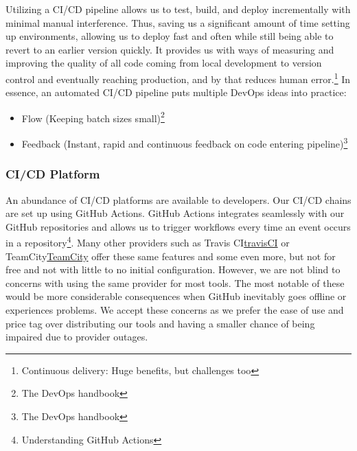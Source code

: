 Utilizing a CI/CD pipeline allows us to test, build, and deploy \mini incrementally with minimal manual interference. Thus, saving us a significant amount of time setting up environments, allowing us to deploy fast and often while still being able to revert to an earlier version quickly.
It provides us with ways of measuring and improving the quality of all code coming from local development to version control and eventually reaching production, and by that reduces human error.\footnote{Continuous delivery: Huge benefits, but challenges too\cite{Chen2015}}
In essence, an automated CI/CD pipeline puts multiple DevOps ideas into practice: 
\begin{itemize}
    \item Flow (Keeping batch sizes small)\footnote{\label{handbook}The DevOps handbook\cite{Kim2016}} 
    \item Feedback (Instant, rapid and continuous feedback on code entering pipeline)\footnote{The DevOps handbook\cite{Kim2016}}
\end{itemize}


\subsubsection{CI/CD Platform}
\label{subsubsec:cicdPlatform}
An abundance of CI/CD platforms are available to developers. Our CI/CD chains are set up using GitHub Actions. GitHub Actions integrates seamlessly with our GitHub repositories and allows us to trigger workflows every time an event occurs in a repository\footnote{Understanding GitHub Actions\cite{githubActions}}. Many other providers such as Travis CI\href{https://travis-ci.org/}{travisCI} or TeamCity\href{https://www.jetbrains.com/teamcity/}{TeamCity} offer these same features and some even more, but not for free and not with little to no initial configuration. However, we are not blind to concerns with using the same provider for most tools. The most notable of these would be more considerable consequences when GitHub inevitably goes offline or experiences problems. We accept these concerns as we prefer the ease of use and price tag over distributing our tools and having a smaller chance of being impaired due to provider outages.

